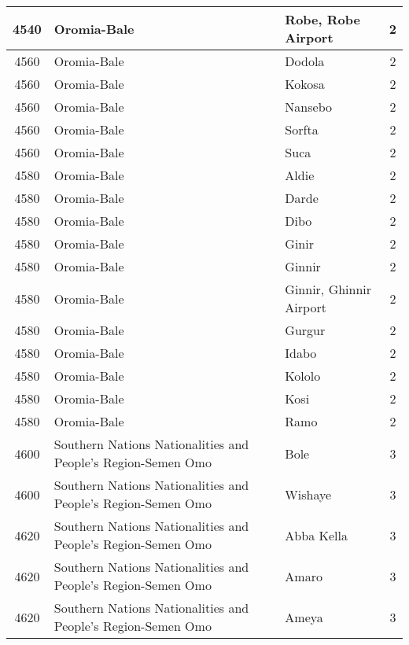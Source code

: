 \documentclass[12pt,a4paper]{report}
\begin{document}
\begin{tabular}{|c|l|l|c|}
\rule[-1ex]{0pt}{2.5ex} 4540 & Oromia-Bale & Robe, Robe Airport & 2 \\ 
\hline 
\rule[-1ex]{0pt}{2.5ex} 4560 & Oromia-Bale & Dodola & 2 \\
\hline 
\rule[-1ex]{0pt}{2.5ex} 4560 & Oromia-Bale & Kokosa & 2 \\
\hline 
\rule[-1ex]{0pt}{2.5ex} 4560 & Oromia-Bale & Nansebo & 2 \\
\hline 
\rule[-1ex]{0pt}{2.5ex} 4560 & Oromia-Bale & Sorfta & 2 \\
\hline 
\rule[-1ex]{0pt}{2.5ex} 4560 & Oromia-Bale & Suca & 2 \\
\hline 
\rule[-1ex]{0pt}{2.5ex} 4580 & Oromia-Bale & Aldie & 2 \\
\hline 
\rule[-1ex]{0pt}{2.5ex} 4580 & Oromia-Bale & Darde & 2 \\
\hline 
\rule[-1ex]{0pt}{2.5ex} 4580 & Oromia-Bale & Dibo & 2 \\
\hline 
\rule[-1ex]{0pt}{2.5ex} 4580 & Oromia-Bale & Ginir & 2 \\
\hline 
\rule[-1ex]{0pt}{2.5ex} 4580 & Oromia-Bale & Ginnir & 2 \\
\hline 
\rule[-1ex]{0pt}{2.5ex} 4580 & Oromia-Bale & Ginnir, Ghinnir Airport & 2 \\
\hline 
\rule[-1ex]{0pt}{2.5ex} 4580 & Oromia-Bale & Gurgur & 2 \\
\hline 
\rule[-1ex]{0pt}{2.5ex} 4580 & Oromia-Bale & Idabo & 2 \\
\hline 
\rule[-1ex]{0pt}{2.5ex} 4580 & Oromia-Bale & Kololo & 2 \\
\hline 
\rule[-1ex]{0pt}{2.5ex} 4580 & Oromia-Bale & Kosi & 2 \\
\hline 
\rule[-1ex]{0pt}{2.5ex} 4580 & Oromia-Bale & Ramo & 2 \\
\hline 
\rule[-1ex]{0pt}{2.5ex} 4600 & Southern Nations Nationalities and People's Region-Semen Omo & Bole & 3 \\
\hline 
\rule[-1ex]{0pt}{2.5ex} 4600 & Southern Nations Nationalities and People's Region-Semen Omo & Wishaye & 3 \\
\hline 
\rule[-1ex]{0pt}{2.5ex} 4620 & Southern Nations Nationalities and People's Region-Semen Omo & Abba Kella & 3 \\
\hline 
\rule[-1ex]{0pt}{2.5ex} 4620 & Southern Nations Nationalities and People's Region-Semen Omo & Amaro & 3 \\
\hline 
\rule[-1ex]{0pt}{2.5ex} 4620 & Southern Nations Nationalities and People's Region-Semen Omo & Ameya & 3 \\

\end{tabular}
\end{document}
